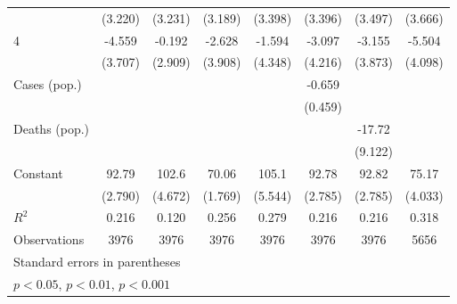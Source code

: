 \documentclass{article}
\begin{document}
{\begin{longtable}{l*{7}{c}}
                &  (3.220)         &  (3.231)         &  (3.189)         &  (3.398)         &  (3.396)         &  (3.497)         &  (3.666)         \\
4               &   -4.559         &   -0.192         &   -2.628         &   -1.594         &   -3.097         &   -3.155         &   -5.504         \\
                &  (3.707)         &  (2.909)         &  (3.908)         &  (4.348)         &  (4.216)         &  (3.873)         &  (4.098)         \\
Cases (pop.)    &                  &                  &                  &                  &   -0.659         &                  &                  \\
                &                  &                  &                  &                  &  (0.459)         &                  &                  \\
Deaths (pop.)   &                  &                  &                  &                  &                  &   -17.72         &                  \\
                &                  &                  &                  &                  &                  &  (9.122)         &                  \\
Constant        &    92.79\sym{***}&    102.6\sym{***}&    70.06\sym{***}&    105.1\sym{***}&    92.78\sym{***}&    92.82\sym{***}&    75.17\sym{***}\\
                &  (2.790)         &  (4.672)         &  (1.769)         &  (5.544)         &  (2.785)         &  (2.785)         &  (4.033)         \\
\hline
\(R^{2}\)       &    0.216         &    0.120         &    0.256         &    0.279         &    0.216         &    0.216         &    0.318         \\
Observations    &     3976         &     3976         &     3976         &     3976         &     3976         &     3976         &     5656         \\
\hline\hline
\multicolumn{8}{l}{\footnotesize Standard errors in parentheses}\\
\multicolumn{8}{l}{\footnotesize \sym{*} \(p<0.05\), \sym{**} \(p<0.01\), \sym{***} \(p<0.001\)}\\
\end{longtable}
}
\end{document}
